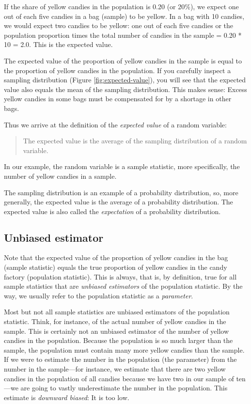 \documentclass[a4paper]{book}
\theoremstyle{definition}
\theoremstyle{definition}
\theoremstyle{definition}
\theoremstyle{remark}
\begin{document}
If the share of yellow candies in the population is 0.20 (or 20\%), we
expect one out of each five candies in a bag (sample) to be yellow. In a
bag with 10 candies, we would expect two candies to be yellow: one out
of each five candies or the population proportion times the total number
of candies in the sample = 0.20 * 10 = 2.0. This is the expected value.

The expected value of the proportion of yellow candies in the sample is
equal to the proportion of yellow candies in the population. If you
carefully inspect a sampling distribution (Figure
\ref{fig:expected-value}), you will see that the expected value also
equals the mean of the sampling distribution. This makes sense: Excess
yellow candies in some bags must be compensated for by a shortage in
other bags.

Thus we arrive at the definition of the \emph{expected value} of a
random variable:

\begin{quote}
The expected value is the average of the sampling distribution of a
random variable.
\end{quote}

In our example, the random variable is a sample statistic, more
specifically, the number of yellow candies in a sample.

The sampling distribution is an example of a probability distribution,
so, more generally, the expected value is the average of a probability
distribution. The expected value is also called the \emph{expectation}
of a probability distribution.

\subsection{Unbiased estimator}\label{unbiased-est}

Note that the expected value of the proportion of yellow candies in the
bag (sample statistic) equals the true proportion of yellow candies in
the candy factory (population statistic). This is always, that is, by
definition, true for all sample statistics that are \emph{unbiased
estimators} of the population statistic. By the way, we usually refer to
the population statistic as a \emph{parameter}.

Most but not all sample statistics are unbiased estimators of the
population statistic. Think, for instance, of the actual number of
yellow candies in the sample. This is certainly not an unbiased
estimator of the number of yellow candies in the population. Because the
population is so much larger than the sample, the population must
contain many more yellow candies than the sample. If we were to estimate
the number in the population (the parameter) from the number in the
sample---for instance, we estimate that there are two yellow candies in
the population of all candies because we have two in our sample of
ten---we are going to vastly underestimate the number in the population.
This estimate is \emph{downward biased}: It is too low.
\end{document}
